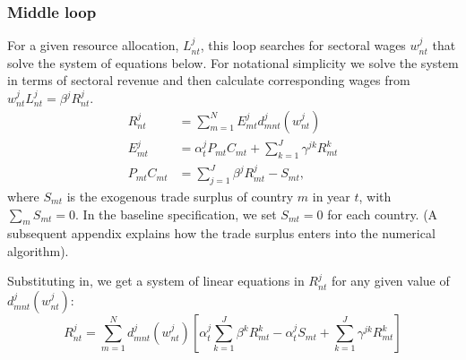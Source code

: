 \documentclass[12pt]{article}
\begin{document}
\subsubsection*{Middle loop}

For a given resource allocation, $L_{nt}^{j}$, this loop searches for
sectoral wages $w_{nt}^{j}$ that solve the system of equations below. For
notational simplicity we solve the system in terms of sectoral revenue and
then calculate corresponding wages from $w_{nt}^{j}L_{nt}^{j}=\beta
^{j}R_{nt}^{j}$. 
\begin{align*}
R_{nt}^{j}& =\sum_{m=1}^{N}E_{mt}^{j}d_{mnt}^{j}\!\left( w_{nt}^{j}\right) \\
E_{mt}^{j}& =\alpha _{t}^{j}P_{mt}C_{mt}+\sum_{k=1}^{J}\gamma ^{jk}R_{mt}^{k}
\\
P_{mt}C_{mt}& =\sum_{j=1}^{J}\beta ^{j}R_{mt}^{j}-S_{mt},
\end{align*}%
where $S_{mt}$ is the exogenous trade surplus of country $m$ in year $t$,
with $\sum_{m}S_{mt}=0$. In the baseline specification, we set $S_{mt}=0$
for each country. (A subsequent appendix explains how the trade surplus
enters into the numerical algorithm).

Substituting in, we get a system of linear equations in $R_{nt}^{j}$ for any
given value of $d_{mnt}^{j}(w_{nt}^{j})$: 
\begin{equation}
R_{nt}^{j}=\sum_{m=1}^{N}d_{mnt}^{j}(w_{nt}^{j})\left[ \alpha
_{t}^{j}\sum_{k=1}^{J}\beta ^{k}R_{mt}^{k}-\alpha
_{t}^{j}S_{mt}+\sum_{k=1}^{J}\gamma ^{jk}R_{mt}^{k}\right]
\label{middle:loop}
\end{equation}
\end{document}
